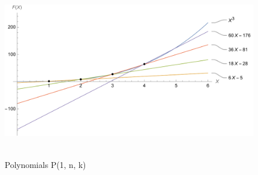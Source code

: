 ﻿\begin{figure}[H]
    \centering
    \includegraphics[width=1\textwidth]{sections/images/01_cubes_with_p_1_n_k}
    ~\caption{Polynomials P(1, n, k)}\label{fig:figure}
\end{figure}
